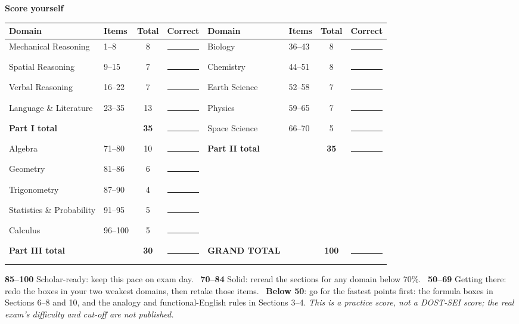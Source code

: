 \documentclass[10pt]{article}
\renewcommand{\arraystretch}{1.12}
\begin{document}
\begin{center}
\begin{tcolorbox}[enhanced, width=6.4in, colback=dmist, colframe=dblue!55, boxrule=0.5pt, arc=2pt,
  left=6pt, right=6pt, top=3pt, bottom=3pt, before skip=0pt, after skip=0pt]
{\sffamily\bfseries\color{dblue}Score yourself}\par\vspace{2pt}
{\footnotesize\renewcommand{\arraystretch}{1.2}\centering
\newcommand{\blank}{\rule{0.45in}{0.4pt}}
\begin{tabular}{@{}l l c c | l l c c@{}}
\toprule
Domain & Items & Total & Correct & Domain & Items & Total & Correct\\\midrule
Mechanical Reasoning & 1--8 & 8 & \blank & Biology & 36--43 & 8 & \blank\\
Spatial Reasoning & 9--15 & 7 & \blank & Chemistry & 44--51 & 8 & \blank\\
Verbal Reasoning & 16--22 & 7 & \blank & Earth Science & 52--58 & 7 & \blank\\
Language \& Literature & 23--35 & 13 & \blank & Physics & 59--65 & 7 & \blank\\
\textbf{Part I total} & & \textbf{35} & \blank & Space Science & 66--70 & 5 & \blank\\
Algebra & 71--80 & 10 & \blank & \textbf{Part II total} & & \textbf{35} & \blank\\
Geometry & 81--86 & 6 & \blank & & & & \\
Trigonometry & 87--90 & 4 & \blank & & & & \\
Statistics \& Probability & 91--95 & 5 & \blank & & & & \\
Calculus & 96--100 & 5 & \blank & & & & \\
\textbf{Part III total} & & \textbf{30} & \blank & \textbf{GRAND TOTAL} & & \textbf{100} & \blank\\\bottomrule
\end{tabular}\par}
\vspace{3pt}
{\footnotesize\textbf{85--100} Scholar-ready: keep this pace on exam day. \textbullet\ \textbf{70--84} Solid: reread the sections for any domain below 70\%. \textbullet\ \textbf{50--69} Getting there: redo the boxes in your two weakest domains, then retake those items. \textbullet\ \textbf{Below 50}: go for the fastest points first: the formula boxes in Sections 6--8 and 10, and the analogy and functional-English rules in Sections 3--4. \emph{This is a practice score, not a DOST-SEI score; the real exam's difficulty and cut-off are not published.}\par}
\end{tcolorbox}
\end{center}
\end{document}
